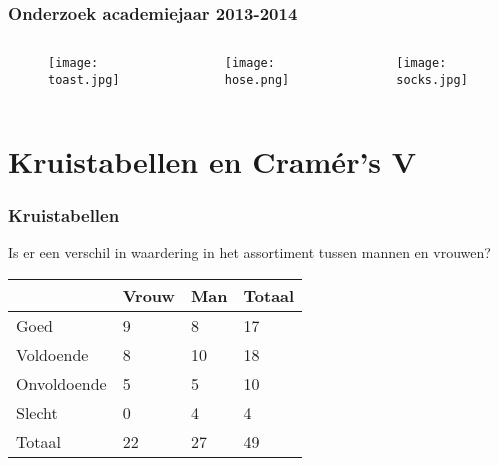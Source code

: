 \documentclass[aspectratio=169]{beamer}
\begin{document}
\begin{frame}
  \frametitle{Onderzoek academiejaar 2013-2014}
  \begin{columns}
    \begin{column}{0.3\textwidth}
      
      \begin{figure}
        \centering
        \texttt{[image: toast.jpg]}
        \label{fig:toast}
      \end{figure}
      
    \end{column}
    \begin{column}{0.3\textwidth}
      
      \begin{figure}
        \centering
        \texttt{[image: hose.png]}
        \label{fig:hose}
      \end{figure}
      
    \end{column}
    \begin{column}{0.3\textwidth}
      
      \begin{figure}
        \centering
        \texttt{[image: socks.jpg]}
        \label{fig:socks}
      \end{figure}
      
    \end{column}
  \end{columns}
\end{frame}

\section{Kruistabellen en Cramér's V}

\begin{frame}
  \frametitle{Kruistabellen}
  Is er een verschil in waardering in het assortiment tussen mannen en vrouwen?
  
  \begin{table}[h]
    \begin{tabular}{l||l|l||l}
      & Vrouw & Man & Totaal \\ \hline \hline
      Goed        & 9     & 8   & 17     \\
      Voldoende   & 8     & 10  & 18     \\
      Onvoldoende & 5     & 5   & 10     \\
      Slecht      & 0     & 4   & 4      \\ \hline \hline
      Totaal      & 22    & 27  & 49     \\
    \end{tabular}
  \end{table}
\end{frame}
\end{document}
